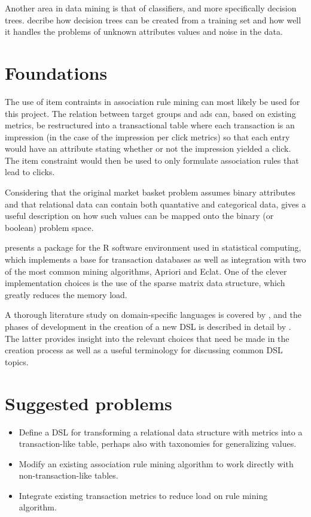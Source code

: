 \documentclass[a4paper]{article}
\begin{document}
Another area in data mining is that of classifiers, and more specifically decision trees. \citet{Quinlan1986} decribe how
decision trees can be created from a training set and how well it handles the problems of unknown attributes values and noise
in the data.

\section{Foundations}

The use of item contraints in association rule mining \citep{Srikant1997} can most likely be used for this project. The 
relation between target groups and ads can, based on existing metrics, be restructured into a transactional table where each 
transaction is an impression (in the case of the impression per click metrics) so that each entry would have an attribute 
stating whether or not the impression yielded a click. The item constraint would then be used to only formulate association 
rules that lead to clicks.

Considering that the original market basket problem assumes binary attributes and that relational data can contain both
quantative and categorical data, \citep{Srikant1996} gives a useful description on how such values can be mapped onto the
binary (or boolean) problem space.

\citet{Hahsler2007} presents a package for the R software environment used in statistical computing, which implements a base
for transaction databases as well as integration with two of the most common mining algorithms, Apriori and Eclat. One of the
clever implementation choices is the use of the sparse matrix data structure, which greatly reduces the memory load.

A thorough literature study on domain-specific languages is covered by \citet{Deursen2000}, and the phases of development in 
the creation of a new DSL is described in detail by \citet{Mernik2005}. The latter provides insight into the relevant choices
that need be made in the creation process as well as a useful terminology for discussing common DSL topics.

\section{Suggested problems}
\begin{itemize}
	\item Define a DSL for transforming a relational data structure with metrics into a transaction-like table, 
			perhaps also with taxonomies for generalizing values.
	\item Modify an existing association rule mining algorithm to work directly with non-transaction-like tables.
	\item Integrate existing transaction metrics to reduce load on rule mining algorithm.
\end{itemize}
\end{document}
